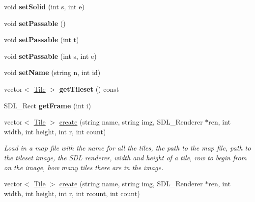 \begin{DoxyCompactItemize}
\item 
void {\bfseries set\+Solid} (int s, int e)\hypertarget{classTileset_a6d40a14146a3dedd0217a412a66f4c9a}{}\label{classTileset_a6d40a14146a3dedd0217a412a66f4c9a}

\item 
void {\bfseries set\+Passable} ()\hypertarget{classTileset_a9fc3756317f238121769629ea20a9849}{}\label{classTileset_a9fc3756317f238121769629ea20a9849}

\item 
void {\bfseries set\+Passable} (int t)\hypertarget{classTileset_a231401092d65e28b7dea12e97e3232ad}{}\label{classTileset_a231401092d65e28b7dea12e97e3232ad}

\item 
void {\bfseries set\+Passable} (int s, int e)\hypertarget{classTileset_a84b12096b06c7162ca4bb9058a232d21}{}\label{classTileset_a84b12096b06c7162ca4bb9058a232d21}

\item 
void {\bfseries set\+Name} (string n, int id)\hypertarget{classTileset_ad5f3a60a84cec25c6e11856a7cd36d84}{}\label{classTileset_ad5f3a60a84cec25c6e11856a7cd36d84}

\item 
vector$<$ \hyperlink{classTile}{Tile} $>$ {\bfseries get\+Tileset} () const \hypertarget{classTileset_ae5f7859d69952b223bdb322796bcc9f2}{}\label{classTileset_ae5f7859d69952b223bdb322796bcc9f2}

\item 
S\+D\+L\+\_\+\+Rect {\bfseries get\+Frame} (int i)\hypertarget{classTileset_aefa962edb9c573aca7327387ba6be0b1}{}\label{classTileset_aefa962edb9c573aca7327387ba6be0b1}

\item 
vector$<$ \hyperlink{classTile}{Tile} $>$ \hyperlink{classTileset_a98c6192618c41b2083ff4c9224c6830d}{create} (string name, string img, S\+D\+L\+\_\+\+Renderer $\ast$ren, int width, int height, int r, int count)\hypertarget{classTileset_a98c6192618c41b2083ff4c9224c6830d}{}\label{classTileset_a98c6192618c41b2083ff4c9224c6830d}

\begin{DoxyCompactList}\small\item\em Load in a map file with the name for all the tiles, the path to the map file, path to the tileset image, the S\+DL renderer, width and height of a tile, row to begin from on the image, how many tiles there are in the image. \end{DoxyCompactList}\item 
vector$<$ \hyperlink{classTile}{Tile} $>$ \hyperlink{classTileset_af0fe3b9f21336f475f2763c9ea7c4a05}{create} (string name, string img, S\+D\+L\+\_\+\+Renderer $\ast$ren, int width, int height, int r, int rcount, int count)\hypertarget{classTileset_af0fe3b9f21336f475f2763c9ea7c4a05}{}\label{classTileset_af0fe3b9f21336f475f2763c9ea7c4a05}


\end{DoxyCompactItemize}
